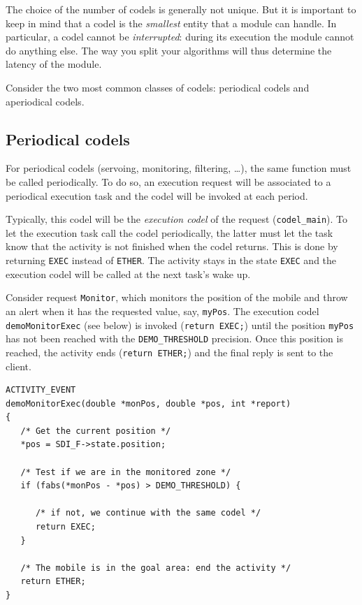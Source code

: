 The choice  of the number of  codels is generally  not unique.  But it is
important to keep in mind that a codel  is the \emph{smallest} entity that
a module can handle. In particular, a  codel cannot be \emph{interrupted}:
during  its execution the   module cannot do   anything else. The way you
split your algorithms will thus determine the latency of the module.

Consider  the two most  common classes of   codels: periodical codels and
aperiodical codels.

\subsection{Periodical codels}

For periodical codels (servoing, monitoring, filtering, \ldots), the same
function must be called periodically. To do so, an execution request will
be associated  to  a periodical  execution task  and  the  codel will  be
invoked at each period.

Typically, this codel  will be the \emph{execution codel} of the  request
(\texttt{codel\_main}).  To let   the    execution task call   the  codel
periodically, the latter must let the task know that  the activity is not
finished  when the codel  returns.  This is done  by returning \texttt{EXEC}
instead  of \texttt{ETHER}.  The activity stays  in the state \texttt{EXEC} and
the execution codel will be called at the next task's wake up.

Consider request \texttt{Monitor},   which monitors the position   of the
mobile and  throw an  alert when it   has the requested value, say,  
\texttt{myPos}.  The  execution codel  \texttt{demoMonitorExec} (see below)  is invoked
(\texttt{return EXEC;}) until the position \texttt{myPos}  has not been reached
with the \texttt{DEMO\_THRESHOLD} precision. Once  this position is reached,
the activity ends (\texttt{return  ETHER;}) and the  final reply is sent  to
the client.

\begin{center}\begin{cartouche}\small\begin{verbatim}
ACTIVITY_EVENT
demoMonitorExec(double *monPos, double *pos, int *report)
{
   /* Get the current position */
   *pos = SDI_F->state.position;

   /* Test if we are in the monitored zone */
   if (fabs(*monPos - *pos) > DEMO_THRESHOLD) {

      /* if not, we continue with the same codel */
      return EXEC;
   }

   /* The mobile is in the goal area: end the activity */
   return ETHER;
}
\end{verbatim}\end{cartouche}\end{center}

